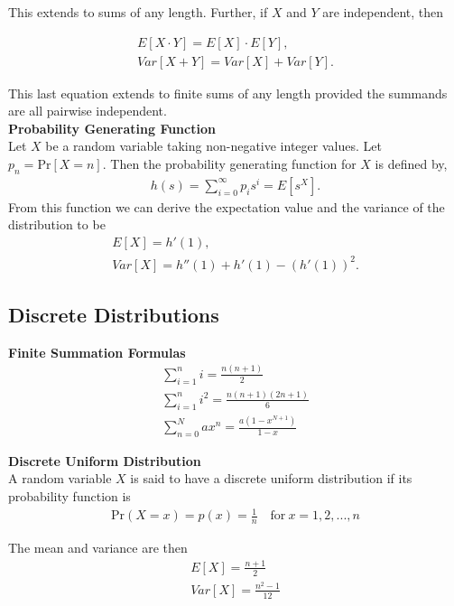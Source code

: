 \documentclass{article}
\numberwithin{theorem}{subsection}
\numberwithin{theorem}{subsubsection}
\numberwithin{lemma}{subsection}
\numberwithin{lemma}{subsubsection}
\theoremstyle{definition}
\numberwithin{definition}{subsection}
\numberwithin{definition}{subsubsection}
\begin{document}
\noindent This extends to sums of any length. Further, if $X$ and $Y$ are independent, then

\begin{gather*}
    E[X\cdot Y] = E[X] \cdot E[Y], \\
    Var[X + Y] = Var[X] + Var[Y].
\end{gather*}

\noindent This last equation extends to finite sums of any length provided the summands are all pairwise independent.\\

\noindent \textbf{Probability Generating Function} \\
\indent Let $X$ be a random variable taking non-negative integer values. Let $p_{n} = \text{Pr}[X=n]$. Then the probability generating function for $X$ is defined by,
\begin{gather*}
    h(s) = \sum_{i=0}^{\infty} p_{i}s^{i} = E[s^{X}].
\end{gather*}
From this function we can derive the expectation value and the variance of the distribution to be
\begin{gather*}
    E[X] = h'(1), \\
    Var[X] = h''(1) + h'(1) - (h'(1))^{2}.
\end{gather*}

\subsection{Discrete Distributions}
\noindent \textbf{Finite Summation Formulas} \\
\begin{gather*}
    \sum_{i=1}^{n} i = \frac{n(n+1)}{2} \\
    \sum_{i=1}^{n} i^2 = \frac{n(n+1)(2n+1)}{6} \\
    \sum_{n=0}^{N} ax^{n} = \frac{a(1-x^{N+1})}{1-x}
\end{gather*}

\noindent \textbf{Discrete Uniform Distribution} \\
\indent A random variable $X$ is said to have a discrete uniform distribution if its probability function is
\begin{gather*}
    \text{Pr}(X = x) = p(x) = \frac{1}{n} \quad \text{for}\ x = 1,2,...,n
\end{gather*}

\indent The mean and variance are then
\begin{gather*}
    E[X] = \frac{n+1}{2} \\
    Var[X] = \frac{n^2 - 1}{12}
\end{gather*}
\end{document}
